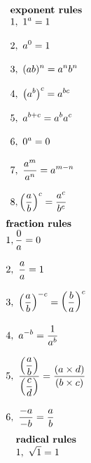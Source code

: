 \documentclass{article}
\begin{document}
\setlength{\columnsep}{3cm}
\begin{multicols}{3}
    \noindent 
    \[
    \begin{array}{>{\displaystyle}l}
        \textbf{exponent\ rules}\\
        1,\ 1^{a} =1\\
        \\
        2,\ a^{0} =1\\
        \\
        3,\ ( ab)^{n} =a^{n} b^{n}\\
        \\
        4,\ \left( a^{b}\right)^{c} =a^{bc}\\
        \\
        5,\ a^{b+c} =a^{b} a^{c}\\
        \\
        6,\ 0^{a} =0\\
        \\
        7,\ \frac{a^{m}}{a^{n}} =a^{m-n}\\
        \\
        8,\left(\frac{a}{b}\right)^{c} =\frac{a^{c}}{b^{c}}
    \end{array}
    \]
    \columnbreak
    \noindent 
    \[
    \begin{array}{>{\displaystyle}l}
        \textbf{fraction\ rules}\\
        1,\frac{0}{a} =0\\
        \\
        2,\ \frac{a}{a} =1\\
        \\
        3,\ \left(\frac{a}{b}\right)^{-c} =\left(\frac{b}{a}\right)^{c}\\
        \\
        4,\ a^{-b} =\frac{1}{a^{b}}\\
        \\
        5,\ \frac{\left(\displaystyle \frac{a}{b}\right)}{\left(\displaystyle \frac{c}{d}\right)} =\frac{( a\times d)}{( b\times c)}\\
        \\
        6,\ \frac{-a}{-b} =\frac{a}{b}
    \end{array}
    \]
    \columnbreak
    \noindent 
    \[
    \begin{array}{>{\displaystyle}l}
        \textbf{radical\ rules}\\
        1,\ \sqrt{1} =1\\
        \\

\end{array}\]
\end{multicols}
\end{document}
